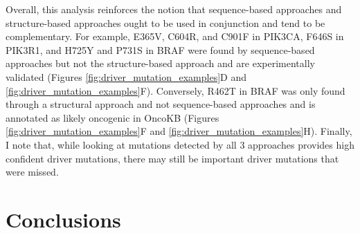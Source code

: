 Overall, this analysis reinforces the notion that sequence-based approaches and structure-based approaches ought to be used in conjunction and tend to be complementary. For example, E365V, C604R, and C901F in PIK3CA, F646S in PIK3R1, and H725Y and P731S in BRAF were found by sequence-based approaches but not the structure-based approach and are experimentally validated (Figures \ref{fig:driver_mutation_examples}D and \ref{fig:driver_mutation_examples}F). Conversely, R462T in BRAF was only found through a structural approach and not sequence-based approaches and is annotated as likely oncogenic in OncoKB (Figures \ref{fig:driver_mutation_examples}F and \ref{fig:driver_mutation_examples}H). Finally, I note that, while looking at mutations detected by all 3 approaches provides high confident driver mutations, there may still be important driver mutations that were missed. 

\section{Conclusions}